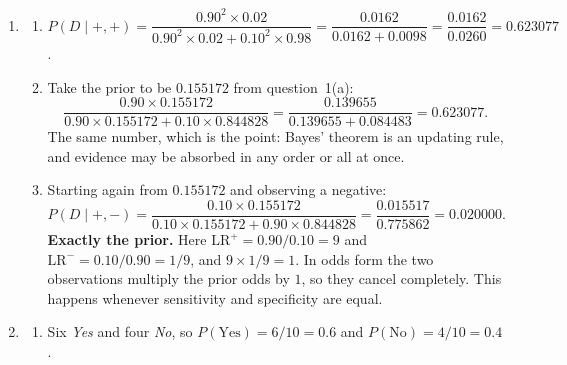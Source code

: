 \documentclass[11pt]{article}
\begin{document}
\begin{enumerate}[leftmargin=*, itemsep=0.7em]
\item
  \begin{enumerate}[label=(\alph*)]
    \item $P(D \mid +,+) = \dfrac{0.90^2 \times 0.02}
      {0.90^2 \times 0.02 + 0.10^2 \times 0.98}
      = \dfrac{0.0162}{0.0162 + 0.0098} = \dfrac{0.0162}{0.0260}
      = \mathbf{0.623077}$.
    \item Take the prior to be $0.155172$ from question~1(a):
      \[
        \frac{0.90 \times 0.155172}
             {0.90 \times 0.155172 + 0.10 \times 0.844828}
        = \frac{0.139655}{0.139655 + 0.084483}
        = \mathbf{0.623077}.
      \]
      The same number, which is the point: Bayes' theorem is an updating
      rule, and evidence may be absorbed in any order or all at once.
    \item Starting again from $0.155172$ and observing a negative:
      \[
        P(D \mid +,-) = \frac{0.10 \times 0.155172}
          {0.10 \times 0.155172 + 0.90 \times 0.844828}
        = \frac{0.015517}{0.775862} = \mathbf{0.020000}.
      \]
      \textbf{Exactly the prior.} Here $\text{LR}^{+} = 0.90/0.10 = 9$ and
      $\text{LR}^{-} = 0.10/0.90 = 1/9$, and $9 \times 1/9 = 1$. In odds
      form the two observations multiply the prior odds by $1$, so they
      cancel completely. This happens whenever sensitivity and specificity
      are equal.
  \end{enumerate}

\item
  \begin{enumerate}[label=(\alph*)]
    \item Six \emph{Yes} and four \emph{No}, so
      $P(\text{Yes}) = 6/10 = 0.6$ and $P(\text{No}) = 4/10 = 0.4$.


\end{enumerate}
\end{enumerate}
\end{document}

